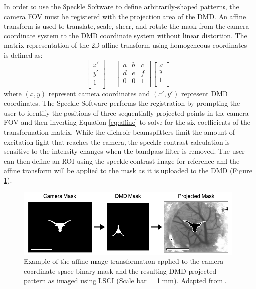In order to use the Speckle Software to define arbitrarily-shaped patterns, the camera FOV must be registered with the projection area of the DMD. An affine transform is used to translate, scale, shear, and rotate the mask from the camera coordinate system to the DMD coordinate system without linear distortion. The matrix representation of the 2D affine transform using homogeneous coordinates is defined as:
%
\begin{equation}
    \label{eq:affine}
    \begin{bmatrix}
        x' \\
        y' \\
        1  \\
    \end{bmatrix}
    =
    \begin{bmatrix}
        a & b & c \\
        d & e & f \\
        0 & 0 & 1 \\
    \end{bmatrix}
    \begin{bmatrix}
        x \\
        y \\
        1 \\
    \end{bmatrix}
\end{equation}
%
where $(x,y)$ represent camera coordinates and $(x',y')$ represent DMD coordinates. The Speckle Software performs the registration by prompting the user to identify the positions of three sequentially projected points in the camera FOV and then inverting Equation \ref{eq:affine} to solve for the six coefficients of the transformation matrix. While the dichroic beamsplitters limit the amount of excitation light that reaches the camera, the speckle contrast calculation is sensitive to the intensity changes when the bandpass filter is removed. The user can then define an ROI using the speckle contrast image for reference and the affine transform will be applied to the mask as it is uploaded to the DMD (Figure \ref{fig:dmdregistration}).

\begin{figure}
    \includegraphics{figures/chapter_2/dmdregistration.pdf}
    \caption[Example of the affine image transformation applied to the camera coordinate space binary mask and the resulting DMD-projected pattern as imaged using LSCI (Scale bar = 1 mm).]{
        \label{fig:dmdregistration}
        Example of the affine image transformation applied to the camera coordinate space binary mask and the resulting DMD-projected pattern as imaged using LSCI (Scale bar = 1 mm). Adapted from \cite{Sullender:2018ff}.
    }
\end{figure}

